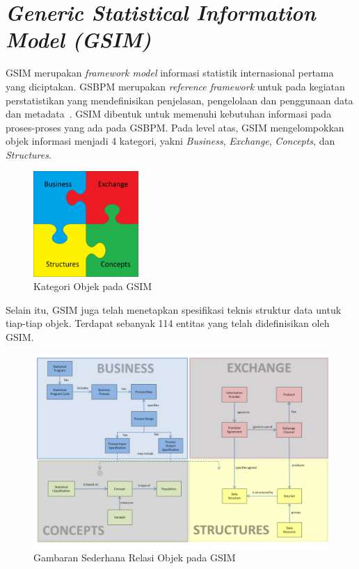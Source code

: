\section{\textit{Generic Statistical Information Model (GSIM)}}
GSIM merupakan \textit{framework model} informasi statistik internasional pertama yang diciptakan. GSBPM merupakan \textit{reference framework} untuk  pada kegiatan perstatistikan yang mendefinisikan penjelasan, pengelolaan dan penggunaan data dan metadata~\cite{_gsim_????}. GSIM dibentuk untuk memenuhi kebutuhan informasi pada proses-proses yang ada pada GSBPM. Pada level atas, GSIM mengelompokkan objek informasi menjadi 4 kategori, yakni \textit{Business}, \textit{Exchange}, \textit{Concepts}, dan \textit{Structures}.

\begin{figure}[h]
    \centering
    \includegraphics[height=4cm]{../../Resources/Images/gsim}
    \caption{Kategori Objek pada GSIM}
    \label{fig:gsim}
\end{figure}

Selain itu, GSIM juga telah menetapkan spesifikasi teknis struktur data untuk tiap-tiap objek. Terdapat sebanyak 114 entitas yang telah didefinisikan oleh GSIM.

\begin{figure}[h]
    \centering
    \includegraphics[width=13cm]{../../Resources/Images/object-relation-gsim}
    \caption{Gambaran Sederhana Relasi Objek pada GSIM}
    \label{fig:object-relation-gsim}
\end{figure}


